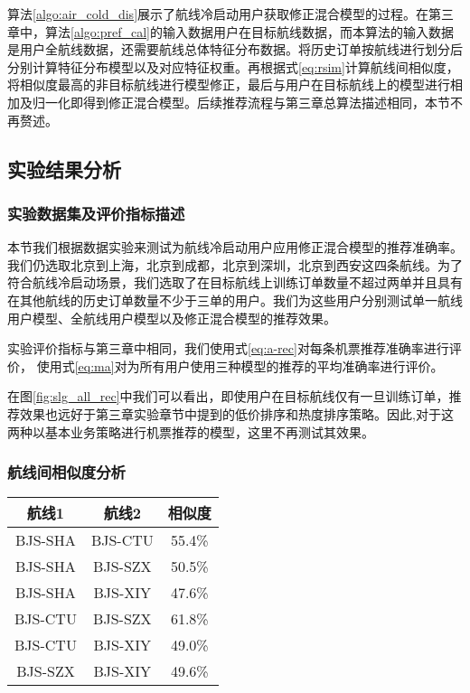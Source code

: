 算法\ref{algo:air_cold_dis}展示了航线冷启动用户获取修正混合模型的过程。在第三章中，算法\ref{algo:pref_cal}的输入数据用户在目标航线数据，而本算法的输入数据是用户全航线数据，还需要航线总体特征分布数据。将历史订单按航线进行划分后分别计算特征分布模型以及对应特征权重。再根据式\ref{eq:rsim}计算航线间相似度，将相似度最高的非目标航线进行模型修正，最后与用户在目标航线上的模型进行相加及归一化即得到修正混合模型。后续推荐流程与第三章总算法描述相同，本节不再赘述。

\subsection{实验结果分析}

\subsubsection{实验数据集及评价指标描述}

本节我们根据数据实验来测试为航线冷启动用户应用修正混合模型的推荐准确率。
我们仍选取北京到上海，北京到成都，北京到深圳，北京到西安这四条航线。为了符合航线冷启动场景，我们选取了在目标航线上训练订单数量不超过两单并且具有在其他航线的历史订单数量不少于三单的用户。我们为这些用户分别测试单一航线用户模型、全航线用户模型以及修正混合模型的推荐效果。

实验评价指标与第三章中相同，我们使用式\ref{eq:a-rec}对每条机票推荐准确率进行评价，
使用式\ref{eq:ma}对为所有用户使用三种模型的推荐的平均准确率进行评价。

在图\ref{fig:slg_all_rec}中我们可以看出，即使用户在目标航线仅有一旦训练订单，推荐效果也远好于第三章实验章节中提到的低价排序和热度排序策略。因此,对于这两种以基本业务策略进行机票推荐的模型，这里不再测试其效果。

\subsubsection{航线间相似度分析}

\begin{table}[!hpb]
  \centering
  \begin{tabular}{|c|c|c|} \hline 
    航线1& 航线2 & 相似度\\ \hline
    BJS-SHA & BJS-CTU & 55.4\% \\ \hline
    BJS-SHA & BJS-SZX & 50.5\% \\ \hline
    BJS-SHA & BJS-XIY & 47.6\% \\ \hline
    BJS-CTU & BJS-SZX & 61.8\% \\ \hline
    BJS-CTU & BJS-XIY & 49.0\% \\ \hline
    BJS-SZX & BJS-XIY & 49.6\% \\ \hline
  \end{tabular}
\end{table}

